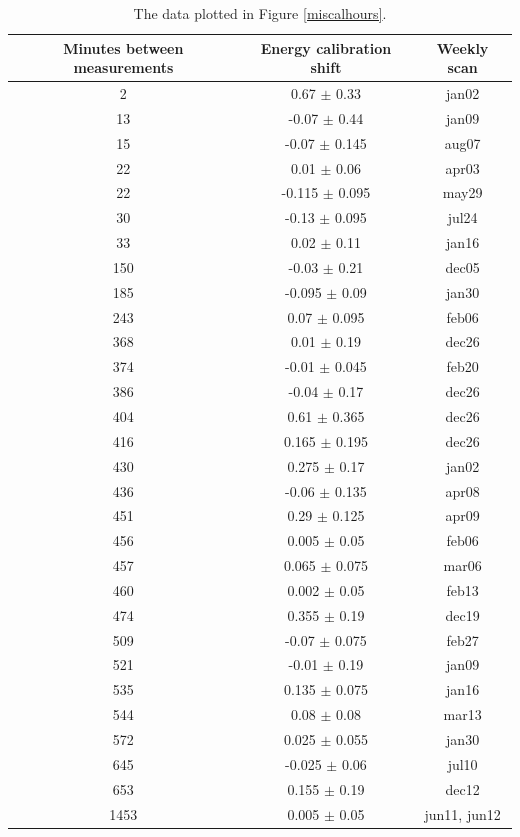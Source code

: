 \documentclass[aps,prd,preprint,superscriptaddress,tightenlines,nofootinbib,floatfix]{revtex4}
\begin{document}
\begin{table}[p]
  \begin{center}
    \renewcommand{\arraystretch}{1.25}
    \begin{tabular}{c c c}
\mbox{\hspace{0.5 cm}} Minutes between measurements \mbox{\hspace{0.5 cm}} & Energy calibration shift \mbox{\hspace{0.5 cm}} & \mbox{\hspace{0.5 cm}} Weekly scan \mbox{\hspace{0.5 cm}} \\\hline
   2 &  0.67  $\pm$ 0.33  & jan02 \\
  13 & -0.07  $\pm$ 0.44  & jan09 \\
  15 & -0.07  $\pm$ 0.145 & aug07 \\
  22 &  0.01  $\pm$ 0.06  & apr03 \\
  22 & -0.115 $\pm$ 0.095 & may29 \\
  30 & -0.13  $\pm$ 0.095 & jul24 \\
  33 &  0.02  $\pm$ 0.11  & jan16 \\
 150 & -0.03  $\pm$ 0.21  & dec05 \\
 185 & -0.095 $\pm$ 0.09  & jan30 \\
 243 &  0.07  $\pm$ 0.095 & feb06 \\
 368 &  0.01  $\pm$ 0.19  & dec26 \\
 374 & -0.01  $\pm$ 0.045 & feb20 \\
 386 & -0.04  $\pm$ 0.17  & dec26 \\
 404 &  0.61  $\pm$ 0.365 & dec26 \\
 416 &  0.165 $\pm$ 0.195 & dec26 \\
 430 &  0.275 $\pm$ 0.17  & jan02 \\
 436 & -0.06  $\pm$ 0.135 & apr08 \\
 451 &  0.29  $\pm$ 0.125 & apr09 \\
 456 &  0.005 $\pm$ 0.05  & feb06 \\
 457 &  0.065 $\pm$ 0.075 & mar06 \\
 460 &  0.002 $\pm$ 0.05  & feb13 \\
 474 &  0.355 $\pm$ 0.19  & dec19 \\
 509 & -0.07  $\pm$ 0.075 & feb27 \\
 521 & -0.01  $\pm$ 0.19  & jan09 \\
 535 &  0.135 $\pm$ 0.075 & jan16 \\
 544 &  0.08  $\pm$ 0.08  & mar13 \\
 572 &  0.025 $\pm$ 0.055 & jan30 \\
 645 & -0.025 $\pm$ 0.06  & jul10 \\
 653 &  0.155 $\pm$ 0.19  & dec12 \\
1453 &  0.005 $\pm$ 0.05  & jun11, jun12 \\\hline
    \end{tabular}
  \end{center}
  \caption{\label{miscaltab} The data plotted in Figure
  \ref{miscalhours}.}
\end{table}
\end{document}
